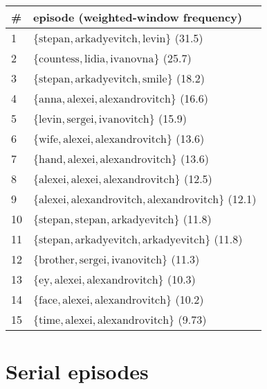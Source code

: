 \begin{appendices}
\begin{longtable}{p{20pt}|p{\dimexpr\textwidth-20pt-\tabcolsep\relax}}
\# & episode (weighted-window frequency) \\
\hline
1 &  $ \{ \text{stepan},\allowbreak \text{arkadyevitch},\allowbreak \text{levin} \} $ (31.5) \\
2 &  $ \{ \text{countess},\allowbreak \text{lidia},\allowbreak \text{ivanovna} \} $ (25.7) \\
3 &  $ \{ \text{stepan},\allowbreak \text{arkadyevitch},\allowbreak \text{smile} \} $ (18.2) \\
4 &  $ \{ \text{anna},\allowbreak \text{alexei},\allowbreak \text{alexandrovitch} \} $ (16.6) \\
5 &  $ \{ \text{levin},\allowbreak \text{sergei},\allowbreak \text{ivanovitch} \} $ (15.9) \\
6 &  $ \{ \text{wife},\allowbreak \text{alexei},\allowbreak \text{alexandrovitch} \} $ (13.6) \\
7 &  $ \{ \text{hand},\allowbreak \text{alexei},\allowbreak \text{alexandrovitch} \} $ (13.6) \\
8 &  $ \{ \text{alexei},\allowbreak \text{alexei},\allowbreak \text{alexandrovitch} \} $ (12.5) \\
9 &  $ \{ \text{alexei},\allowbreak \text{alexandrovitch},\allowbreak \text{alexandrovitch} \} $ (12.1) \\
10 & $ \{ \text{stepan},\allowbreak \text{stepan},\allowbreak \text{arkadyevitch} \} $ (11.8) \\
11 & $ \{ \text{stepan},\allowbreak \text{arkadyevitch},\allowbreak \text{arkadyevitch} \} $ (11.8) \\
12 & $ \{ \text{brother},\allowbreak \text{sergei},\allowbreak \text{ivanovitch} \} $ (11.3) \\
13 & $ \{ \text{ey},\allowbreak \text{alexei},\allowbreak \text{alexandrovitch} \} $ (10.3) \\
14 & $ \{ \text{face},\allowbreak \text{alexei},\allowbreak \text{alexandrovitch} \} $ (10.2) \\
15 & $ \{ \text{time},\allowbreak \text{alexei},\allowbreak \text{alexandrovitch} \} $ (9.73) \\
\end{longtable}

\section{Serial episodes}


\end{appendices}
